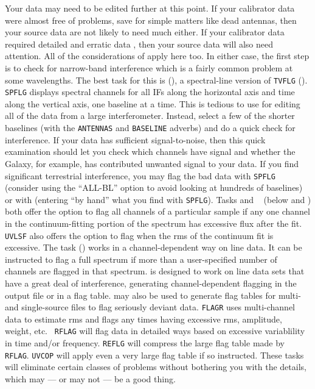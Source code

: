      Your data may need to be edited further at this point.  If your
calibrator data were almost free of problems, save for simple matters
like dead antennas, then your source data are not likely to need much
 either.  If your calibrator data required detailed and
erratic data , then your source data will also need
attention.  All of the considerations of  apply here too.
In either case, the first step is to check for narrow-band interference
which is a fairly common problem at some wavelengths.  The best task
for this is {\tt {}} (), a spectral-line version
of {\tt TVFLG} ().  {\tt SPFLG} displays spectral channels
for all IFs along the horizontal axis and time along the vertical
axis, one baseline at a time.  This is tedious to use for editing all
of the data from a large interferometer. Instead, select a few of
the shorter baselines (with the {\tt ANTENNAS} and {\tt BASELINE}
adverbs) and do a quick check for interference.  If your data has
sufficient signal-to-noise, then this quick examination should let you
check which channels have signal and whether the Galaxy, for example,
has contributed unwanted signal to your data.  If you find significant
terrestrial interference, you may flag the bad data with {\tt SPFLG}
(consider using the ``ALL-BL'' option to avoid looking at hundreds of
baselines) or with {\tt {}} (entering ``by hand'' what you
find with {\tt SPFLG}).  Tasks {\tt {}} and {\tt
{}} (below and ) both offer the option to flag
all channels of a particular sample if any one channel in the
continuum-fitting portion of the spectrum has excessive flux after the
fit.  {\tt UVLSF} also offers the option to flag when the rms of the
continuum fit is excessive.  The task {\tt {}}
() works in a channel-dependent way on line data. It can
be instructed to flag a full spectrum if more than a user-specified
number of channels are flagged in that spectrum.  {\tt {}}
is designed to work on line data sets that have a great deal of
interference, generating channel-dependent flagging in the output file
or in a flag table.  {\tt {}} may also be used to generate
flag tables for multi- and single-source files to flag seriously
deviant data.  {\tt FLAGR} uses multi-channel data to estimate rms and
flags any times having excessive rms, amplitude, weight, etc.  {\tt
RFLAG} will flag data in detailed ways based on excessive variablility
in time and/or frequency.  {\tt REFLG} will compress the large flag
table made by {\tt RFLAG}\@.  {\tt UVCOP} will apply even a very large
flag table if so instructed.  These tasks will eliminate certain
classes of problems without bothering you with the details, which may
--- or may not --- be a good thing.

